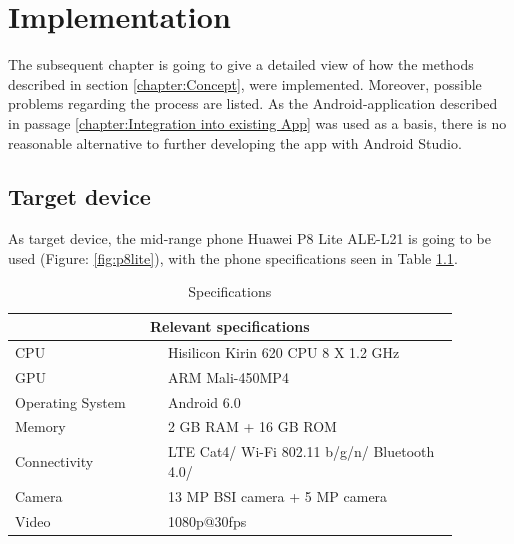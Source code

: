 

\chapter{Implementation}\label{chapter:Implementation}
The subsequent chapter is going to give a detailed view of how the methods described in section \ref{chapter:Concept}, were implemented. Moreover, possible problems regarding the process are listed. 
As the Android-application described in passage \ref{chapter:Integration into existing App} was used as a basis, there is no reasonable alternative to further developing the app with Android Studio.

\section{Target device}
As target device, the mid-range phone Huawei P8 Lite ALE-L21 is going to be used (Figure: \ref{fig:p8lite}), with the phone specifications seen in Table \ref{table:specifications}.
\begin{table}[h]
	\begin{tabular}{|p{0.3\linewidth} || p{0.58\linewidth}|}
		\hline
		\multicolumn{2}{|c|}{Relevant specifications} \\
		\hline\hline
		CPU & Hisilicon Kirin 620 CPU 8 X 1.2 GHz \\
		\hline
		GPU & ARM Mali-450MP4 \\
		\hline
		Operating System & Android 6.0  \\
		\hline
		Memory & 2 GB RAM + 16 GB ROM \\
		\hline
		Connectivity & LTE Cat4/ Wi-Fi 802.11 b/g/n/ Bluetooth 4.0/ \\
		\hline
		Camera & 13 MP BSI camera + 5 MP camera\\
		\hline
		Video & 1080p@30fps \\
		\hline
	\end{tabular}
	\caption{Specifications}
	\label{table:specifications}
\end{table}
